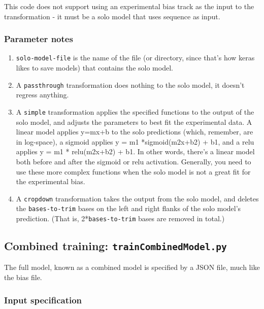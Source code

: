 \documentclass{article}
\begin{document}
This code does not support using an experimental bias track as the input to the 
transformation - it must be a solo model that uses sequence as input.

\subsubsection{Parameter notes}

\begin{enumerate}
    \item \texttt{solo-model-file} is the name of the file (or directory, since that's how keras likes to save models) that contains the solo model. 
    \item A \texttt{passthrough} transformation does nothing to the solo model, it doesn't regress anything. 
    \item A \texttt{simple} transformation applies the specified functions to the output of the solo model, and adjusts the parameters to best fit the experimental data. A linear model applies y=mx+b to the solo predictions (which, remember, are in log-space), a sigmoid applies y = m1 *sigmoid(m2x+b2) + b1, and a relu applies y = m1 * relu(m2x+b2) + b1. In other words, there's a linear model both before and after the sigmoid or relu activation. Generally, you need to use these more complex functions when the solo model is not a great fit for the experimental bias. 
    \item A \texttt{cropdown} transformation takes the output from the solo model, and deletes the \texttt{bases-to-trim} bases on the left and right flanks of the solo model's prediction. (That is, 2*\texttt{bases-to-trim} bases are removed in total.)
\end{enumerate}



\newpage

\subsection{Combined training: \texttt{trainCombinedModel.py}}

The full model, known as a combined model is specified by a JSON file, much like the bias file.

\subsubsection{Input specification}
\end{document}
